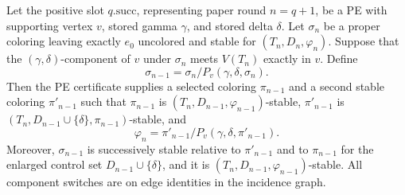 \begin{lemma}
Let the positive slot \(q.\mathrm{succ}\), representing paper round
\(n=q+1\), be a PE with supporting vertex \(v\), stored gamma
\(\gamma\), and stored delta \(\delta\).  Let \(\sigma_n\) be a proper
coloring leaving exactly \(e_0\) uncolored and stable for
\((T_n,D_n,\varphi_n)\).  Suppose that the
\((\gamma,\delta)\)-component of \(v\) under \(\sigma_n\) meets
\(V(T_n)\) exactly in \(v\).  Define
\[
 \sigma_{n-1}=\sigma_n/P_v(\gamma,\delta,\sigma_n).
\]
Then the PE certificate supplies a selected coloring \(\pi_{n-1}\) and
a second stable coloring \(\pi'_{n-1}\) such that
\(\pi_{n-1}\) is \((T_n,D_{n-1},\varphi_{n-1})\)-stable,
\(\pi'_{n-1}\) is
\((T_n,D_{n-1}\cup\{\delta\},\pi_{n-1})\)-stable, and
\[
 \varphi_n=\pi'_{n-1}/P_v(\gamma,\delta,\pi'_{n-1}).             \tag{1}
\]
Moreover, \(\sigma_{n-1}\) is successively stable relative to
\(\pi'_{n-1}\) and to \(\pi_{n-1}\) for the enlarged control set
\(D_{n-1}\cup\{\delta\}\), and it is
\((T_n,D_{n-1},\varphi_{n-1})\)-stable.
All component switches are on edge identities in the incidence graph.
\end{lemma}
